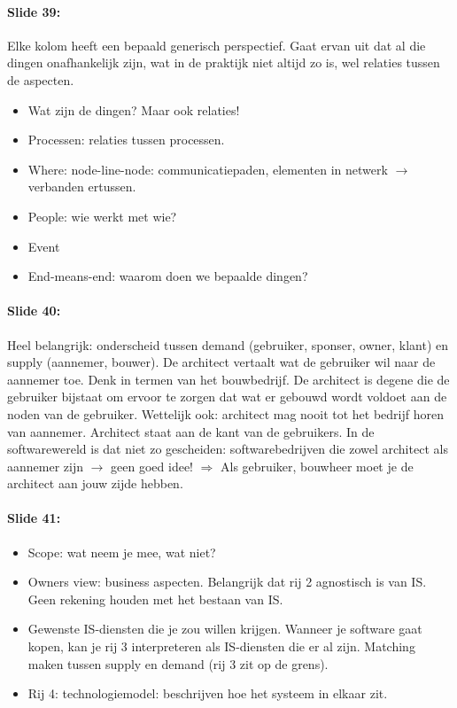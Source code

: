 \documentclass[10pt,a4paper]{report}
\begin{document}
\paragraph{Slide 39:}Elke kolom heeft een bepaald generisch perspectief. Gaat ervan uit dat al die dingen onafhankelijk zijn, wat in de praktijk niet altijd zo is, wel relaties tussen de aspecten.
\begin{itemize} 
\item Wat zijn de dingen? Maar ook relaties!
\item Processen: relaties tussen processen.
\item Where: node-line-node: communicatiepaden, elementen in netwerk $\rightarrow$ verbanden ertussen.
\item People: wie werkt met wie?
\item Event
\item End-means-end: waarom doen we bepaalde dingen?
\end{itemize}	
	
\paragraph{Slide 40:}Heel belangrijk: onderscheid tussen demand (gebruiker, sponser, owner, klant) en supply (aannemer, bouwer). De architect vertaalt wat de gebruiker wil naar de aannemer toe. Denk in termen van het bouwbedrijf. De architect is degene die de gebruiker bijstaat om ervoor te zorgen dat wat er gebouwd wordt voldoet aan de noden van de gebruiker. Wettelijk ook: architect mag nooit tot het bedrijf horen van aannemer. Architect staat aan de kant van de gebruikers. In de softwarewereld is dat niet zo gescheiden: softwarebedrijven die zowel architect als aannemer zijn $\rightarrow$ geen goed idee! $\Rightarrow$ Als gebruiker, bouwheer moet je de architect aan jouw zijde hebben.

\paragraph{Slide 41:}
\begin{itemize}  
\item Scope: wat neem je mee, wat niet?
\item Owners view: business aspecten. Belangrijk dat rij 2 agnostisch is van IS. Geen rekening houden met het bestaan van IS.
\item Gewenste IS-diensten die je zou willen krijgen. Wanneer je software gaat kopen, kan je rij 3 interpreteren als IS-diensten die er al zijn. Matching maken tussen supply en demand (rij 3 zit op de grens).
\item Rij 4: technologiemodel: beschrijven hoe het systeem in elkaar zit.
\end{itemize}
\end{document}
